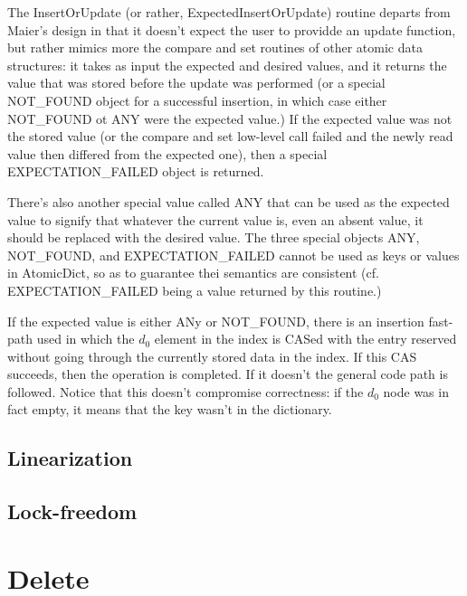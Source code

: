 

The InsertOrUpdate (or rather, ExpectedInsertOrUpdate) routine departs from Maier's design in that it doesn't expect the user to providde an update function, but rather mimics more the compare and set routines of other atomic data structures: it takes as input the expected and desired values, and it returns the value that was stored before the update was performed (or a special NOT\_FOUND object for a successful insertion, in which case either NOT\_FOUND ot ANY were the expected value.)
If the expected value was not the stored value (or the compare and set low-level call failed and the newly read value then differed from the expected one), then a special EXPECTATION\_FAILED object is returned.

There's also another special value called ANY that can be used as the expected value to signify that whatever the current value is, even an absent value, it should be replaced with the desired value.
The three special objects ANY, NOT\_FOUND, and EXPECTATION\_FAILED cannot be used as keys or values in AtomicDict, so as to guarantee thei semantics are consistent (cf. EXPECTATION\_FAILED being a value returned by this routine.)

If the expected value is either ANy or NOT\_FOUND, there is an insertion fast-path used in which the $d_0$ element in the index is CASed with the entry reserved without going through the currently stored data in the index.
If this CAS succeeds, then the operation is completed.
If it doesn't the general code path is followed.
Notice that this doesn't compromise correctness: if the $d_0$ node was in fact empty, it means that the key wasn't in the dictionary.

\subsection{Linearization}
\subsection{Lock-freedom}

\section{Delete}



